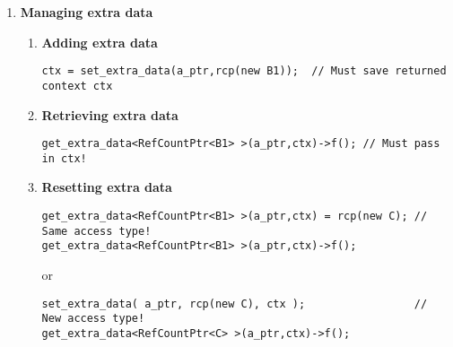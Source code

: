 \begin{enumerate}
\item {\bf Managing extra data}
%
\begin{enumerate}
%
\item {\bf Adding extra data}
%
{\small\begin{verbatim}
ctx = set_extra_data(a_ptr,rcp(new B1));  // Must save returned context ctx
\end{verbatim}}
%
\item {\bf Retrieving extra data}
%
{\small\begin{verbatim}
get_extra_data<RefCountPtr<B1> >(a_ptr,ctx)->f(); // Must pass in ctx!
\end{verbatim}}
%
\item {\bf Resetting extra data}
%
{\small\begin{verbatim}
get_extra_data<RefCountPtr<B1> >(a_ptr,ctx) = rcp(new C); // Same access type!
get_extra_data<RefCountPtr<B1> >(a_ptr,ctx)->f();
\end{verbatim}}
or
{\small\begin{verbatim}
set_extra_data( a_ptr, rcp(new C), ctx );                 // New access type!
get_extra_data<RefCountPtr<C> >(a_ptr,ctx)->f();
\end{verbatim}}
%
\end{enumerate}

\end{enumerate}

